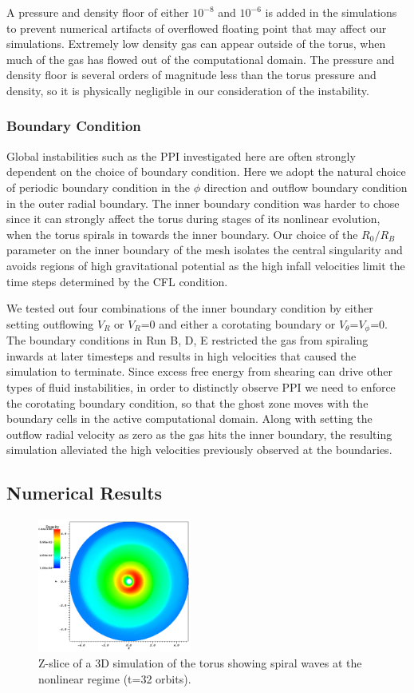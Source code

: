 \documentclass[iop,revtex4]{emulateapj}
\begin{document}
\par A pressure and density floor of either $10^{-8}$ and $10^{-6}$ is added in the simulations to prevent numerical artifacts of overflowed floating point that may affect our simulations. Extremely low density gas can appear outside of the torus, when much of the gas has flowed out of the computational domain. The pressure and density floor is several orders of magnitude less than the torus pressure and density, so it is physically negligible in our consideration of the instability.
\subsubsection{Boundary Condition\label{sec:BC}}
\par Global instabilities such as the \ac{PPI} investigated here are often strongly dependent on the choice of boundary condition. Here we adopt the natural choice of  periodic boundary condition in the $\phi$ direction and outflow boundary condition in the outer radial boundary. The inner boundary condition was harder to chose since it can strongly affect the torus during stages of its nonlinear evolution, when the torus spirals in towards the inner boundary. Our choice of the $R_0/R_B$ parameter on the inner boundary of the mesh isolates the central singularity and avoids regions of high gravitational potential as the high infall velocities limit the time steps determined by the \ac{CFL} condition. 
\par We tested out four combinations of the inner boundary condition by either setting outflowing $V_R$ or $V_R$=0 and either a corotating boundary or $V_\theta$=$V_\phi$=0. The boundary conditions in Run B, D, E restricted the gas from spiraling inwards at later timesteps and results in high velocities that caused the simulation to terminate. Since excess free energy from shearing can drive other types of fluid instabilities, in order to distinctly observe \ac{PPI} we need to enforce the corotating boundary condition, so that the ghost zone moves with the boundary cells in the active computational domain.  Along with setting the outflow radial velocity as zero as the gas hits the inner boundary, the resulting simulation alleviated the high velocities previously observed at the boundaries. 
\subsection{Numerical Results\label{ppi_results}}
\begin{figure}
\includegraphics[width=0.45\textwidth]{plots/t32_orbit.png}
\caption{Z-slice of a 3D simulation of the torus showing spiral waves at the nonlinear regime (t=32 orbits). }
\label{t32_orbit}
\end{figure}
\end{document}

